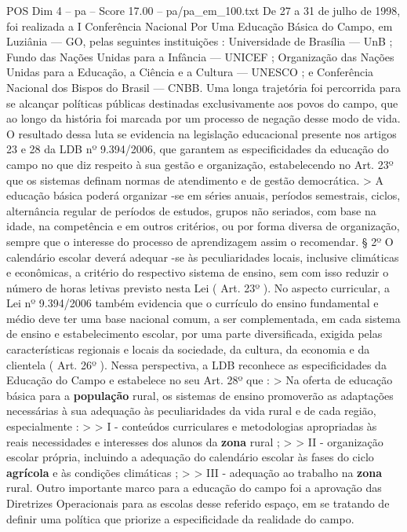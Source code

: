 \begin{textsample}{POS Dim 4 – pa – Score 17.00 – pa/pa\_em\_100.txt}
De 27 a 31 de julho de 1998, foi realizada a I Conferência Nacional Por Uma Educação Básica do Campo, em Luziânia — GO, pelas seguintes instituições : Universidade de Brasília — UnB ; Fundo das Nações Unidas para a Infância — UNICEF ; Organização das Nações Unidas para a Educação, a Ciência e a Cultura — UNESCO ; e Conferência Nacional dos Bispos do Brasil — CNBB.
Uma longa trajetória foi percorrida para se alcançar políticas públicas destinadas exclusivamente aos povos do campo, que ao longo da história foi marcada por um processo de negação desse modo de vida.
O resultado dessa luta se evidencia na legislação educacional presente nos artigos 23 e 28 da LDB nº 9.394/2006, que garantem as especificidades da educação do campo no que diz respeito à sua gestão e organização, estabelecendo no Art. 23º que os sistemas definam normas de atendimento e de gestão democrática. > A educação básica poderá organizar -se em séries anuais, períodos semestrais, ciclos, alternância regular de períodos de estudos, grupos não seriados, com base na idade, na competência e em outros critérios, ou por forma diversa de organização, sempre que o interesse do processo de aprendizagem assim o recomendar. § 2º O calendário escolar deverá adequar -se às peculiaridades locais, inclusive climáticas e econômicas, a critério do respectivo sistema de ensino, sem com isso reduzir o número de horas letivas previsto nesta Lei ( Art. 23º ).
No aspecto curricular, a Lei nº 9.394/2006 também evidencia que o currículo do ensino fundamental e médio deve ter uma base nacional comum, a ser complementada, em cada sistema de ensino e estabelecimento escolar, por uma parte diversificada, exigida pelas características regionais e locais da sociedade, da cultura, da economia e da clientela ( Art. 26º ).
Nessa perspectiva, a LDB reconhece as especificidades da Educação do Campo e estabelece no seu Art. 28º que : > Na oferta de educação básica para a \textbf{população} rural, os sistemas de ensino promoverão as adaptações necessárias à sua adequação às peculiaridades da vida rural e de cada região, especialmente : > > I - conteúdos curriculares e metodologias apropriadas às reais necessidades e interesses dos alunos da \textbf{zona} rural ; > > II - organização escolar própria, incluindo a adequação do calendário escolar às fases do ciclo \textbf{agrícola} e às condições climáticas ; > > III - adequação ao trabalho na \textbf{zona} rural.
Outro importante marco para a educação do campo foi a aprovação das Diretrizes Operacionais para as escolas desse referido espaço, em se tratando de definir uma política que priorize a especificidade da realidade do campo.

\end{textsample}
